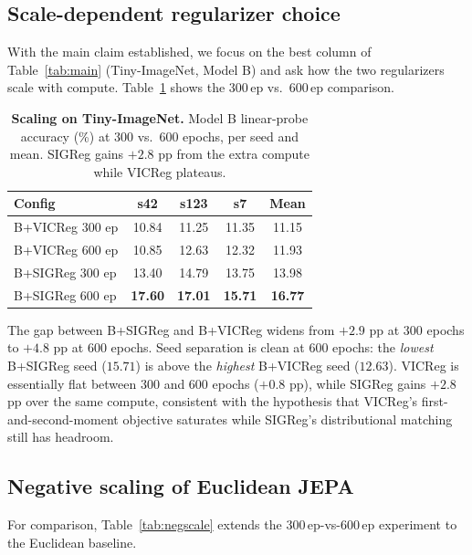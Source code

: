 \documentclass{article}
\begin{document}
\subsection{Scale-dependent regularizer choice}
\label{sec:results:scaling}

With the main claim established, we focus on the best column of Table~\ref{tab:main} (Tiny-ImageNet, Model B) and ask how the two regularizers scale with compute. Table~\ref{tab:scaling} shows the 300\,ep vs.\ 600\,ep comparison.

\begin{table}[t]
  \centering
  \caption{\textbf{Scaling on Tiny-ImageNet.} Model B linear-probe accuracy (\%) at 300 vs.\ 600 epochs, per seed and mean. SIGReg gains $+2.8$ pp from the extra compute while VICReg plateaus.}
  \label{tab:scaling}
  \small
  \begin{tabular}{l c c c c}
    \toprule
    Config & s42 & s123 & s7 & Mean \\
    \midrule
    B+VICReg 300 ep & 10.84 & 11.25 & 11.35 & 11.15 \\
    B+VICReg 600 ep & 10.85 & 12.63 & 12.32 & 11.93 \\
    \midrule
    B+SIGReg 300 ep & 13.40 & 14.79 & 13.75 & 13.98 \\
    B+SIGReg 600 ep & \textbf{17.60} & \textbf{17.01} & \textbf{15.71} & \textbf{16.77} \\
    \bottomrule
  \end{tabular}
\end{table}

The gap between B+SIGReg and B+VICReg widens from $+2.9$ pp at 300 epochs to $+4.8$ pp at 600 epochs. Seed separation is clean at 600 epochs: the \emph{lowest} B+SIGReg seed ($15.71$) is above the \emph{highest} B+VICReg seed ($12.63$). VICReg is essentially flat between 300 and 600 epochs ($+0.8$ pp), while SIGReg gains $+2.8$ pp over the same compute, consistent with the hypothesis that VICReg's first-and-second-moment objective saturates while SIGReg's distributional matching still has headroom.

\subsection{Negative scaling of Euclidean JEPA}
\label{sec:results:negscale}

For comparison, Table~\ref{tab:negscale} extends the 300\,ep-vs-600\,ep experiment to the Euclidean baseline.
\end{document}
